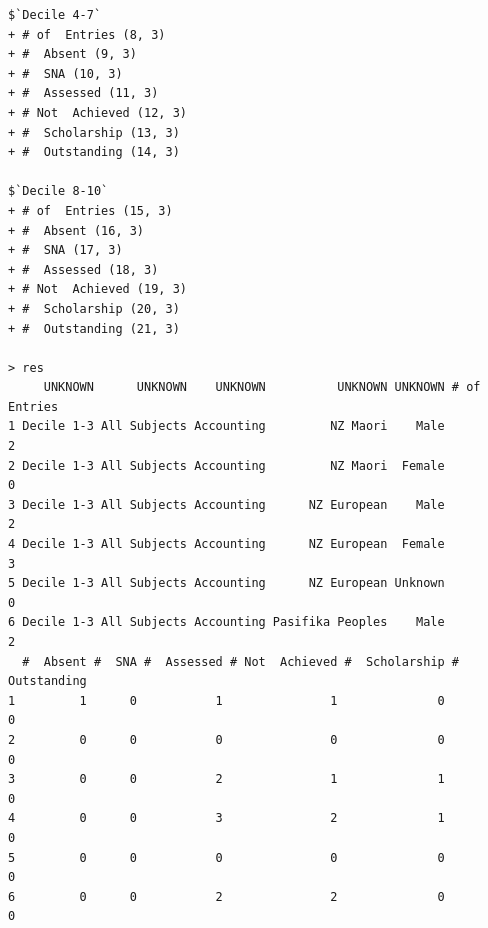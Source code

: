 \documentclass[a4paper]{article}
\begin{document}
\begin{verbatim}
$`Decile 4-7`
+ # of  Entries (8, 3)
+ #  Absent (9, 3)
+ #  SNA (10, 3)
+ #  Assessed (11, 3)
+ # Not  Achieved (12, 3)
+ #  Scholarship (13, 3)
+ #  Outstanding (14, 3)

$`Decile 8-10`
+ # of  Entries (15, 3)
+ #  Absent (16, 3)
+ #  SNA (17, 3)
+ #  Assessed (18, 3)
+ # Not  Achieved (19, 3)
+ #  Scholarship (20, 3)
+ #  Outstanding (21, 3)

> res 
     UNKNOWN      UNKNOWN    UNKNOWN          UNKNOWN UNKNOWN # of  Entries
1 Decile 1-3 All Subjects Accounting         NZ Maori    Male             2
2 Decile 1-3 All Subjects Accounting         NZ Maori  Female             0
3 Decile 1-3 All Subjects Accounting      NZ European    Male             2
4 Decile 1-3 All Subjects Accounting      NZ European  Female             3
5 Decile 1-3 All Subjects Accounting      NZ European Unknown             0
6 Decile 1-3 All Subjects Accounting Pasifika Peoples    Male             2
  #  Absent #  SNA #  Assessed # Not  Achieved #  Scholarship #  Outstanding
1         1      0           1               1              0              0
2         0      0           0               0              0              0
3         0      0           2               1              1              0
4         0      0           3               2              1              0
5         0      0           0               0              0              0
6         0      0           2               2              0              0
\end{verbatim}

\newpage
\end{document}
